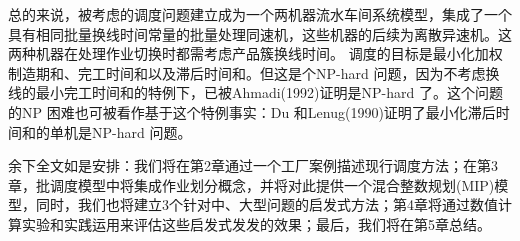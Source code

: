 总的来说，被考虑的调度问题建立成为一个两机器流水车间系统模型，集成了一个具有相同批量换线时间常量的批量处理同速机，这些机器的后续为离散异速机。这两种机器在处理作业切换时都需考虑产品簇换线时间。
调度的目标是最小化加权制造期和、完工时间和以及滞后时间和。但这是个NP-hard 问题，因为不考虑换线的最小完工时间和的特例下，已被Ahmadi(1992)证明是NP-hard 了。这个问题的NP 困难也可被看作基于这个特例事实：Du 和Lenug(1990)证明了最小化滞后时间和的单机是NP-hard 问题。

余下全文如是安排：我们将在第2章通过一个工厂案例描述现行调度方法；在第3章，批调度模型中将集成作业划分概念，并将对此提供一个混合整数规划(MIP)模型，同时，我们也将建立3个针对中、大型问题的启发式方法；第4章将通过数值计算实验和实践运用来评估这些启发式发发的效果；最后，我们将在第5章总结。


%
